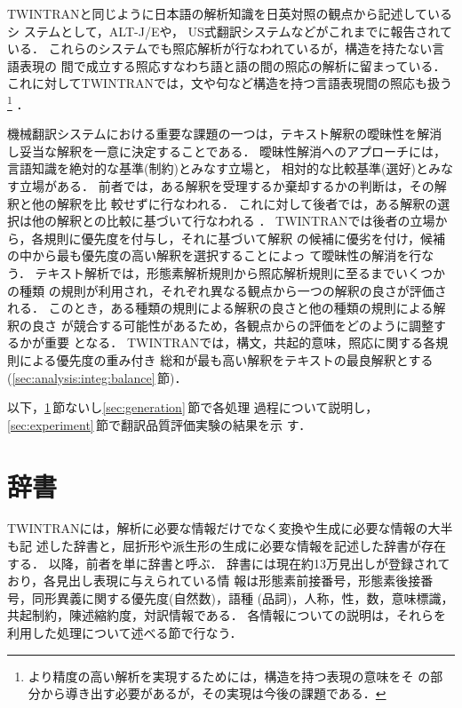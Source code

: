 TWINTRANと同じように日本語の解析知識を日英対照の観点から記述しているシ
ステムとして，ALT-J/E\cite{Ikehara96,Nakaiwa97}や，
US式翻訳システム\cite{Shibata96a,Shibata98}などがこれまでに報告されている．
これらのシステムでも照応解析が行なわれているが，構造を持たない言語表現の
間で成立する照応すなわち語と語の間の照応の解析に留まっている．
これに対してTWINTRANでは，文や句など構造を持つ言語表現間の照応も扱う
\footnote{より精度の高い解析を実現するためには，構造を持つ表現の意味をそ
の部分から導き出す必要があるが，その実現は今後の課題である．}
．

機械翻訳システムにおける重要な課題の一つは，テキスト解釈の曖昧性を解消
し妥当な解釈を一意に決定することである．
曖昧性解消へのアプローチには，言語知識を絶対的な基準(制約)とみなす立場と，
相対的な比較基準(選好)とみなす立場がある\cite{Nagao92}．
前者では，ある解釈を受理するか棄却するかの判断は，その解釈と他の解釈を比
較せずに行なわれる．
これに対して後者では，ある解釈の選択は他の解釈との比較に基づいて行なわれる
\cite{Wilks78,Tsujii88b,Shimazu89,Hobbs90,Den96}．
TWINTRANでは後者の立場から，各規則に優先度を付与し，それに基づいて解釈
の候補に優劣を付け，候補の中から最も優先度の高い解釈を選択することによっ
て曖昧性の解消を行なう．
テキスト解析では，形態素解析規則から照応解析規則に至るまでいくつかの種類
の規則が利用され，それぞれ異なる観点から一つの解釈の良さが評価される．
このとき，ある種類の規則による解釈の良さと他の種類の規則による解釈の良さ
が競合する可能性があるため，各観点からの評価をどのように調整するかが重要
となる．
TWINTRANでは，構文，共起的意味，照応に関する各規則による優先度の重み付き
総和が最も高い解釈をテキストの最良解釈とする
(\ref{sec:analysis:integ:balance}\,節)．

以下，\ref{sec:analysis:dict}\,節ないし\ref{sec:generation}\,節で各処理
過程について説明し，\ref{sec:experiment}\,節で翻訳品質評価実験の結果を示
す．

\section{辞書}
\label{sec:analysis:dict}

TWINTRANには，解析に必要な情報だけでなく変換や生成に必要な情報の大半も記
述した辞書と，屈折形や派生形の生成に必要な情報を記述した辞書が存在する．
以降，前者を単に辞書と呼ぶ．
辞書には現在約13万見出しが登録されており，各見出し表現に与えられている情
報は形態素前接番号，形態素後接番号，同形異義に関する優先度(自然数)，語種
(品詞)，人称，性，数，意味標識，共起制約，陳述縮約度，対訳情報である．
各情報についての説明は，それらを利用した処理について述べる節で行なう．

